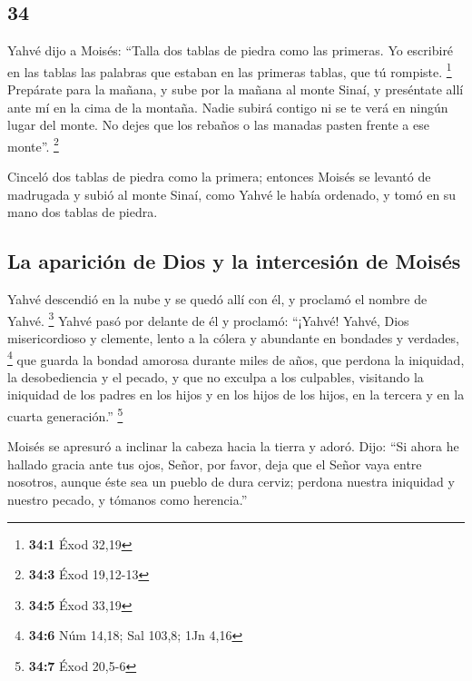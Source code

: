 \begin{paracol}{2}
\hypertarget{section-66}{%
\section{34}\label{section-66}}

 Yahvé dijo a Moisés: ``Talla dos tablas de piedra como
las primeras. Yo escribiré en las tablas las palabras que estaban en las
primeras tablas, que tú rompiste. \footnote{\textbf{34:1} Éxod 32,19}
 Prepárate para la mañana, y sube por la mañana al monte
Sinaí, y preséntate allí ante mí en la cima de la montaña.
 Nadie subirá contigo ni se te verá en ningún lugar del
monte. No dejes que los rebaños o las manadas pasten frente a ese
monte''. \footnote{\textbf{34:3} Éxod 19,12-13}

 Cinceló dos tablas de piedra como la primera; entonces
Moisés se levantó de madrugada y subió al monte Sinaí, como Yahvé le
había ordenado, y tomó en su mano dos tablas de piedra.

\hypertarget{la-apariciuxf3n-de-dios-y-la-intercesiuxf3n-de-moisuxe9s}{%
\subsection{La aparición de Dios y la intercesión de
Moisés}\label{la-apariciuxf3n-de-dios-y-la-intercesiuxf3n-de-moisuxe9s}}

 Yahvé descendió en la nube y se quedó allí con él, y
proclamó el nombre de Yahvé. \footnote{\textbf{34:5} Éxod 33,19}
 Yahvé pasó por delante de él y proclamó: ``¡Yahvé! Yahvé,
Dios misericordioso y clemente, lento a la cólera y abundante en
bondades y verdades, \footnote{\textbf{34:6} Núm 14,18; Sal 103,8; 1Jn
  4,16}  que guarda la bondad amorosa durante miles de
años, que perdona la iniquidad, la desobediencia y el pecado, y que no
exculpa a los culpables, visitando la iniquidad de los padres en los
hijos y en los hijos de los hijos, en la tercera y en la cuarta
generación.'' \footnote{\textbf{34:7} Éxod 20,5-6}

 Moisés se apresuró a inclinar la cabeza hacia la tierra y
adoró.  Dijo: ``Si ahora he hallado gracia ante tus ojos,
Señor, por favor, deja que el Señor vaya entre nosotros, aunque éste sea
un pueblo de dura cerviz; perdona nuestra iniquidad y nuestro pecado, y
tómanos como herencia.''

\hypertarget{dios-consiente-la-renovaciuxf3n-de-la-relaciuxf3n-del-pacto-con-advertencias-serias}{%
}
\end{paracol}
